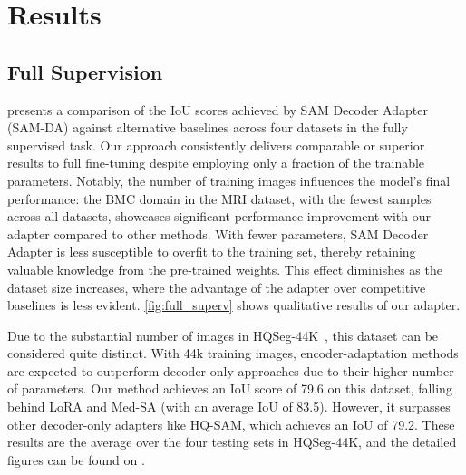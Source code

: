 \section{Results}
\label{sec:samda_results}



\subsection{Full Supervision}
 presents a comparison of the IoU scores achieved by SAM Decoder Adapter (SAM-DA) against alternative baselines across four datasets in the fully supervised task. Our approach consistently delivers comparable or superior results to full fine-tuning despite employing only a fraction of the trainable parameters. Notably, the number of training images influences the model's final performance: the BMC domain in the MRI dataset, with the fewest samples across all datasets, showcases significant performance improvement with our adapter compared to other methods. With fewer parameters, SAM Decoder Adapter is less susceptible to overfit to the training set, thereby retaining valuable knowledge from the pre-trained weights. This effect diminishes as the dataset size increases, where the advantage of the adapter over competitive baselines is less evident. \cref{fig:full_superv} shows qualitative results of our adapter.



Due to the substantial number of images in HQSeg-44K~, this dataset can be considered quite distinct. With 44k training images, encoder-adaptation methods are expected to outperform decoder-only approaches due to their higher number of parameters. Our method achieves an IoU score of 79.6 on this dataset, falling behind LoRA and Med-SA (with an average IoU of 83.5). However, it surpasses other decoder-only adapters like HQ-SAM, which achieves an IoU of 79.2. These results are the average over the four testing sets in HQSeg-44K, and the detailed figures can be found on .

